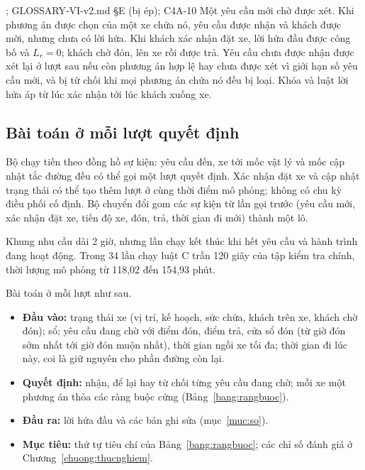 ; GLOSSARY-VI-v2.md §E (bị ép); C4A-10
Một yêu cầu mới chờ được xét. Khi phương án được chọn của một xe chứa nó, yêu cầu được nhận và khách được mời,
nhưng chưa có lời hứa. Khi khách xác nhận đặt xe, lời hứa đầu được công bố và $L_r = 0$; khách chờ đón, lên xe
rồi được trả. Yêu cầu chưa được nhận được xét lại ở lượt sau nếu còn phương án hợp lệ hay chưa được xét vì giới
hạn số yêu cầu mới, và bị từ chối khi mọi phương án chứa nó đều bị loại. Khóa và luật lời hứa áp từ lúc xác nhận
tới lúc khách xuống xe.

\subsection{Bài toán ở mỗi lượt quyết định}
\label{muc:baitoan-phatbieu}

Bộ chạy tiến theo đồng hồ sự kiện: yêu cầu đến, xe tới mốc vật lý và mốc cập nhật tắc đường đều có thể gọi một
lượt quyết định. Xác nhận đặt xe và cập nhật trạng thái có thể tạo thêm lượt ở cùng thời điểm mô phỏng; không có
chu kỳ điều phối cố định. Bộ chuyển đổi gom các sự kiện từ lần gọi trước (yêu cầu mới, xác nhận đặt xe, tiến độ xe,
đón, trả, thời gian đi mới) thành một lô.

Khung nhu cầu dài 2 giờ, nhưng lần chạy kết thúc khi hết yêu cầu và hành trình đang hoạt động. Trong 34 lần chạy
luật C trần 120 giây của tập kiểm tra chính, thời lượng mô phỏng từ 118,02 đến 154,93 phút.

Bài toán ở mỗi lượt như sau.
\begin{itemize}[leftmargin=1.2cm,itemsep=2pt,topsep=3pt]
\item \textbf{Đầu vào:} trạng thái xe (vị trí, kế hoạch, sức chứa, khách trên xe, khách chờ đón); sổ; yêu cầu
đang chờ với điểm đón, điểm trả, cửa sổ đón (từ giờ đón sớm nhất tới giờ đón muộn nhất), thời gian ngồi xe tối
đa; thời gian đi lúc này, coi là giữ nguyên cho phần đường còn lại.
\item \textbf{Quyết định:} nhận, để lại hay từ chối từng yêu cầu đang chờ; mỗi xe một phương án thỏa các ràng
buộc cứng (Bảng~\ref{bang:rangbuoc}).
\item \textbf{Đầu ra:} lời hứa đầu và các bản ghi sửa (mục~\ref{muc:so}).
\item \textbf{Mục tiêu:} thứ tự tiêu chí của Bảng~\ref{bang:rangbuoc}; các chỉ số đánh giá ở
Chương~\ref{chuong:thucnghiem}.
\end{itemize}

